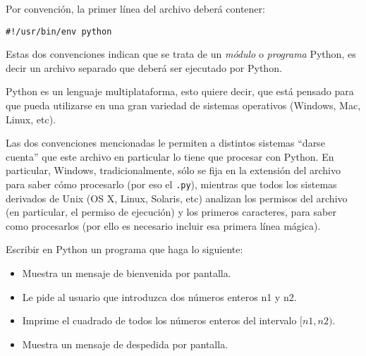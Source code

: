 Por convención, la primer línea del archivo deberá contener:
\begin{verbatim}
#!/usr/bin/env python
\end{verbatim}

Estas dos convenciones indican que se trata de un {\it módulo} o {\it programa}
Python, es decir un archivo separado que deberá ser ejecutado por Python.

\begin{sabias_que}
Python es un lenguaje multiplataforma, esto quiere decir, que está pensado
para que pueda utilizarse en una gran variedad de sistemas operativos
(Windows, Mac, Linux, etc).

Las dos convenciones mencionadas le permiten a distintos sistemas ``darse
cuenta'' que este archivo en particular lo tiene que procesar con Python.
En particular, Windows, tradicionalmente, sólo se fija en la extensión del
archivo para saber cómo procesarlo (por eso el \verb!.py!), mientras que
todos los sistemas derivados de Unix (OS X, Linux, Solaris, etc) analizan
los permisos del archivo (en particular, el permiso de ejecución) y los
primeros caracteres, para saber como procesarlos (por ello es necesario
incluir esa primera línea mágica).
\end{sabias_que}

\begin{problema}
Escribir en Python un programa que haga lo siguiente:

\begin{itemize}
\item Muestra un mensaje de bienvenida por pantalla.
\item Le pide al usuario que introduzca dos números enteros n1 y n2.
\item Imprime el cuadrado de todos los números enteros del intervalo $[n1, n2)$.
\item Muestra un mensaje de despedida por pantalla.
\end{itemize}
\end{problema}

